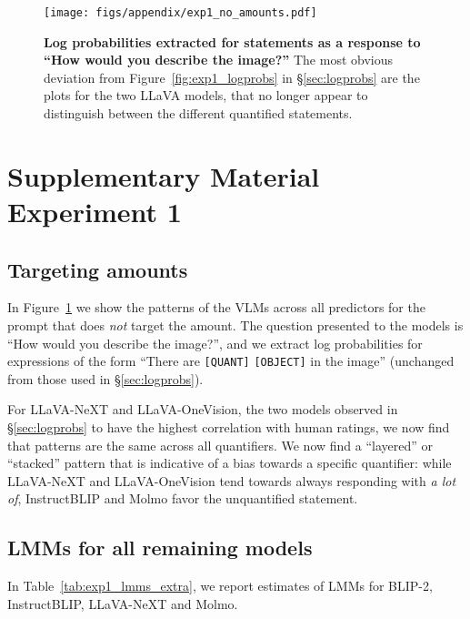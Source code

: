 \begin{figure}[t]
    \centering
    \texttt{[image: figs/appendix/exp1\_no\_amounts.pdf]}
    \caption{\textbf{Log probabilities extracted for statements as a response to ``How would you describe the image?''} The most obvious deviation from Figure~\ref{fig:exp1_logprobs} in \S\ref{sec:logprobs} are the plots for the two LLaVA models, that no longer appear to distinguish between the different quantified statements.}
    \label{fig:app_exp1_no_amounts}
\end{figure}
\section{Supplementary Material Experiment 1}\label{appendix:exp1}

\subsection{Targeting amounts}
In Figure~\ref{fig:app_exp1_no_amounts} we show the patterns of the VLMs across all predictors for the prompt that does \emph{not} target the amount. The question presented to the models is ``How would you describe the image?'', and we extract log probabilities for expressions of the form ``There are \verb|[QUANT]| \verb|[OBJECT]| in the image'' (unchanged from those used in \S\ref{sec:logprobs}).

For LLaVA-NeXT and LLaVA-OneVision, the two models observed in \S\ref{sec:logprobs} to have the highest correlation with human ratings, we now find that patterns are the same across all quantifiers. We now find a ``layered'' or ``stacked'' pattern that is indicative of a bias towards a specific quantifier: while LLaVA-NeXT and LLaVA-OneVision tend towards always responding with \textit{a lot of}, InstructBLIP and Molmo favor the unquantified statement.


\subsection{LMMs for all remaining models}
In Table~\ref{tab:exp1_lmms_extra}, we report estimates of LMMs for BLIP-2, InstructBLIP, LLaVA-NeXT and Molmo.

